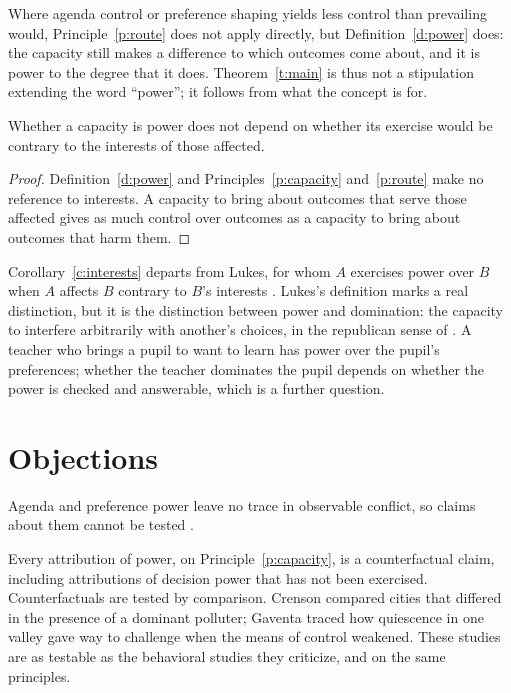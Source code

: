 \documentclass{situationist-preprint}
\begin{document}
Where agenda control or preference shaping yields less control than prevailing would, Principle~\ref{p:route} does not apply directly, but Definition~\ref{d:power} does: the capacity still makes a difference to which outcomes come about, and it is power to the degree that it does. Theorem~\ref{t:main} is thus not a stipulation extending the word \enquote{power}; it follows from what the concept is for.

\begin{corollary}\label{c:interests}
Whether a capacity is power does not depend on whether its exercise would be contrary to the interests of those affected.
\end{corollary}

\begin{proof}
Definition~\ref{d:power} and Principles~\ref{p:capacity} and~\ref{p:route} make no reference to interests. A capacity to bring about outcomes that serve those affected gives as much control over outcomes as a capacity to bring about outcomes that harm them.
\end{proof}

Corollary~\ref{c:interests} departs from Lukes, for whom $A$ exercises power over $B$ when $A$ affects $B$ contrary to $B$'s interests \citep[ch.~4]{Lukes2005}. Lukes's definition marks a real distinction, but it is the distinction between power and domination: the capacity to interfere arbitrarily with another's choices, in the republican sense of \citet{Pettit1997}. A teacher who brings a pupil to want to learn has power over the pupil's preferences; whether the teacher dominates the pupil depends on whether the power is checked and answerable, which is a further question.

\section{Objections}

\begin{objection}[Unobservability]
Agenda and preference power leave no trace in observable conflict, so claims about them cannot be tested \citep{Polsby1963}.
\end{objection}

\begin{reply}
Every attribution of power, on Principle~\ref{p:capacity}, is a counterfactual claim, including attributions of decision power that has not been exercised. Counterfactuals are tested by comparison. Crenson compared cities that differed in the presence of a dominant polluter; Gaventa traced how quiescence in one valley gave way to challenge when the means of control weakened. These studies are as testable as the behavioral studies they criticize, and on the same principles.
\end{reply}
\end{document}
